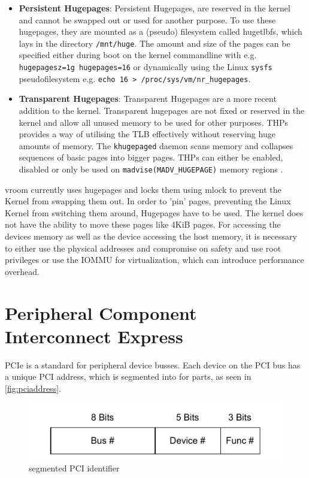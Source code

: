 \begin{itemize}
    \item \textbf{Persistent Hugepages}: Persistent Hugepages, are reserved in the kernel and cannot be swapped out or used for another purpose. To use these hugepages, they are mounted as a (pseudo) filesystem called hugetlbfs, which lays in the directory \texttt{/mnt/huge}. The amount and size of the pages can be specified either during boot on the kernel commandline with e.g. \texttt{hugepagesz=1g hugepages=16} or dynamically using the Linux \texttt{sysfs} pseudofilesystem e.g. \texttt{echo 16 > /proc/sys/vm/nr\_hugepages}\cite{hugetlbkerneldocs}.
    \item \textbf{Transparent Hugepages}: Transparent Hugepages are a more recent addition to the kernel. Transparent hugepages are not fixed or reserved in the kernel and allow all unused memory to be used for other purposes. THPs provides a way of utilising the TLB effectively without reserving huge amounts of memory. The \texttt{khugepaged} daemon scans memory and collapses sequences of basic pages into bigger pages. THPs can either be enabled, disabled or only be used on \texttt{madvise(MADV\_HUGEPAGE)} memory regions \cite{transhugekerneldocs}.
\end{itemize}

vroom currently uses hugepages and locks them using mlock to prevent the Kernel from swapping them out. In order to 'pin' pages, preventing the Linux Kernel from switching them around, Hugepages have to be used. The kernel does not have the ability to move these pages like 4KiB pages.
For accessing the devices memory as well as the device accessing the host memory, it is necessary to either use the physical addresses and compromise on safety and use root privileges or use the IOMMU for virtualization, which can introduce performance overhead.

\section{Peripheral Component Interconnect Express}
PCIe is a standard for peripheral device busses. Each device on the PCI bus has a unique PCI address, which is segmented into for parts, as seen in \autoref{fig:pciaddress}.

\begin{figure}
    \centering
    \includegraphics[width=\textwidth]{figures/pciaddress.pdf}
    \caption{segmented PCI identifier}
    \label{fig:pciaddress}
\end{figure}

